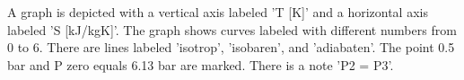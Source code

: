 A graph is depicted with a vertical axis labeled 'T [K]' and a horizontal axis labeled 'S [kJ/kgK]'. The graph shows curves labeled with different numbers from 0 to 6. There are lines labeled 'isotrop', 'isobaren', and 'adiabaten'. The point 0.5 bar and P zero equals 6.13 bar are marked. There is a note 'P2 = P3'.